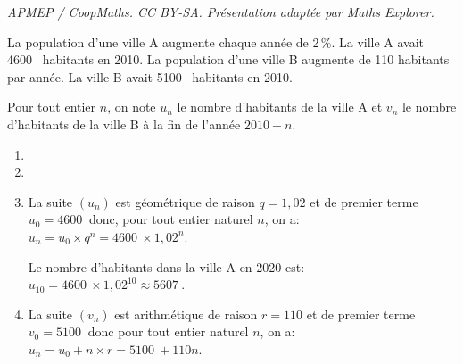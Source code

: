 \documentclass[10pt]{article}
\providecommand{\np}[2][]{{#2~#1}}
\begin{document}
\noindent\textit{APMEP / CoopMaths. CC BY-SA. Présentation adaptée par Maths Explorer.}\par\medskip
\medskip

La population d'une ville A augmente chaque année de 2\,\%. 
La ville A avait \np{4600} habitants en 2010.
La population d'une ville B augmente de 110 habitants par année.
La ville B avait \np{5100} habitants en 2010.

Pour tout entier $n$, on note $u_n$ le nombre d'habitants de la ville A et $v_n$ le nombre d'habitants de la ville B à la fin de l'année $2010 + n$.

\medskip

\begin{enumerate}
\item
{}

\item
{}

\item 
La suite $(u_n)$ est géométrique de raison $q=1,02$ et de premier terme $u_0=\np{4600}$ donc, pour tout entier naturel $n$, on a: $u_n=u_0\times q^n = \np{4600}\times 1,02^n$.

Le nombre d'habitants dans la ville A en 2020 est: $u_{10}=\np{4600}\times 1,02^{10}\approx \np{5607}$.

\item 
La suite $(v_n)$ est arithmétique de raison $r=110$ et de premier terme $v_0=\np{5100}$ donc pour tout entier naturel $n$, on a:
$u_n=u_0 + n\times r = \np{5100} + 110n$.


\end{enumerate}
\end{document}
